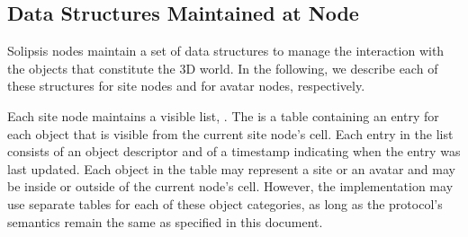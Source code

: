 \newcommand{\avhb}{\ensuremath{\textsc{avNodeHBeat}}\xspace}

\newcommand{\snhb}{\ensuremath{\textsc{siteNodeHBeat}}\xspace}

\newcommand{\vupd}{\ensuremath{\textsc{vUpdate}}\xspace}

\newcommand{\avupd}{\ensuremath{\textsc{avUpdate}}\xspace}

\newcommand{\ncache}{\ensuremath{\textsc{newCopy}}\xspace}




\newcommand{\safed}{\ensuremath{\textsc{safeD}}\xspace}
\newcommand{\neighd}{\ensuremath{\textsc{neighD}}\xspace}





\subsection{Data Structures Maintained at Node}
Solipsis nodes maintain a set of data structures to manage the
interaction with the objects that constitute the 3D world. In the
following, we describe each of these structures for site nodes and for
avatar nodes, respectively.


\dstruct{\vlist}
Each site node maintains a visible list, \vlist. The \vlist is a table
containing an entry for each object that is visible from the current
site node's cell. Each entry in the list consists of an object
descriptor and of a timestamp indicating when the entry was last
updated.  Each object in the table may represent a site or an avatar
and may be inside or outside of the current node's cell. However, the
implementation may use separate tables for each of these object
categories, as long as the protocol's semantics remain the same as
specified in this document.


